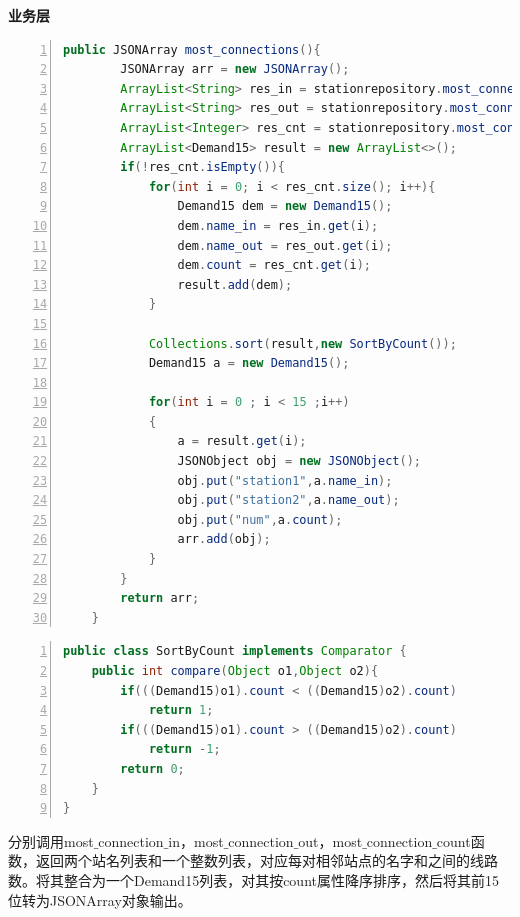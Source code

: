 \documentclass[11pt,a4paper]{article}
\begin{document}
\textbf{业务层} \\
\begin{lstlisting}[numbers = left, 
showstringspaces=false,
showspaces = false,
breaklines = true, 
language=Java]
    public JSONArray most_connections(){
        JSONArray arr = new JSONArray();
        ArrayList<String> res_in = stationrepository.most_connection_in();
        ArrayList<String> res_out = stationrepository.most_connection_out();
        ArrayList<Integer> res_cnt = stationrepository.most_connection_count();
        ArrayList<Demand15> result = new ArrayList<>();
        if(!res_cnt.isEmpty()){
            for(int i = 0; i < res_cnt.size(); i++){
                Demand15 dem = new Demand15();
                dem.name_in = res_in.get(i);
                dem.name_out = res_out.get(i);
                dem.count = res_cnt.get(i);
                result.add(dem);
            }

            Collections.sort(result,new SortByCount());
            Demand15 a = new Demand15();

            for(int i = 0 ; i < 15 ;i++)
            {
                a = result.get(i);
                JSONObject obj = new JSONObject();
                obj.put("station1",a.name_in);
                obj.put("station2",a.name_out);
                obj.put("num",a.count);
                arr.add(obj);
            }
        }
        return arr;
    }
\end{lstlisting} 
\begin{lstlisting}[numbers = left, 
showstringspaces=false,
showspaces = false,
breaklines = true, 
language=Java]
public class SortByCount implements Comparator {
    public int compare(Object o1,Object o2){
        if(((Demand15)o1).count < ((Demand15)o2).count)
            return 1;
        if(((Demand15)o1).count > ((Demand15)o2).count)
            return -1;
        return 0;
    }
}
\end{lstlisting} 
分别调用most$\_$connection$\_$in，most$\_$connection$\_$out，most$\_$connection$\_$count函数，返回两个站名列表和一个整数列表，对应每对相邻站点的名字和之间的线路数。将其整合为一个Demand15列表，对其按count属性降序排序，然后将其前15位转为JSONArray对象输出。
\end{document}
